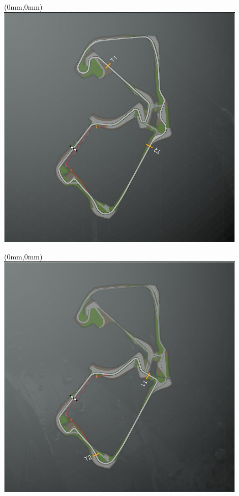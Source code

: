 \null\newpage
\begin{textblock*}{30mm}(0mm,0mm)%
\includegraphics[width=120mm]{TR/2015-05-20_00056.png}
\end{textblock*}
\null\newpage
\begin{textblock*}{30mm}(0mm,0mm)%
\includegraphics[width=120mm]{TR/2015-05-20_00057.png}
\end{textblock*}
